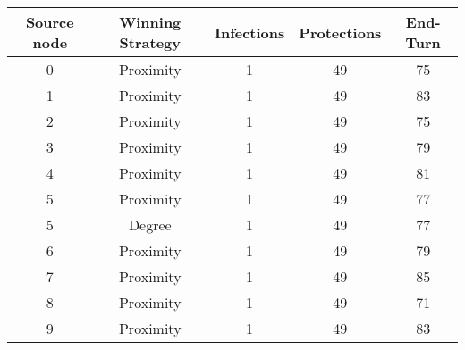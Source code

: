 \documentclass[results.tex]{subfiles}
\begin{document}
    \begin{center}
        \begin{tabular}{| c || c | c | c | c |}
            \hline
            {\bfseries Source node} & {\bfseries Winning Strategy} & {\bfseries Infections} & {\bfseries Protections}
            & {\bfseries End-Turn}
            \\  %
            \hline\hline
            0                       & Proximity                    & 1                      & 49                      & 75                   \\
            \hline
            1                       & Proximity                    & 1                      & 49                      & 83                   \\
            \hline
            2                       & Proximity                    & 1                      & 49                      & 75                   \\
            \hline
            3                       & Proximity                    & 1                      & 49                      & 79                   \\
            \hline
            4                       & Proximity                    & 1                      & 49                      & 81                   \\
            \hline
            5                       & Proximity                    & 1                      & 49                      & 77                   \\
            \hline
            5                       & Degree                       & 1                      & 49                      & 77                   \\
            \hline
            6                       & Proximity                    & 1                      & 49                      & 79                   \\
            \hline
            7                       & Proximity                    & 1                      & 49                      & 85                   \\
            \hline
            8                       & Proximity                    & 1                      & 49                      & 71                   \\
            \hline
            9                       & Proximity                    & 1                      & 49                      & 83                   \\

\end{tabular}
\end{center}
\end{document}
